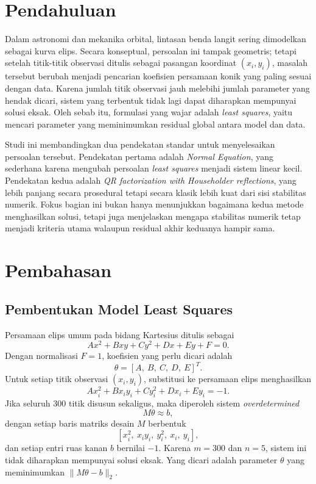 \documentclass[12pt,a4paper]{article}
\begin{document}
\section{Pendahuluan}
Dalam astronomi dan mekanika orbital, lintasan benda langit sering dimodelkan sebagai kurva elips. Secara konseptual, persoalan ini tampak geometris; tetapi setelah titik-titik observasi ditulis sebagai pasangan koordinat \((x_i,y_i)\), masalah tersebut berubah menjadi pencarian koefisien persamaan konik yang paling sesuai dengan data. Karena jumlah titik observasi jauh melebihi jumlah parameter yang hendak dicari, sistem yang terbentuk tidak lagi dapat diharapkan mempunyai solusi eksak. Oleh sebab itu, formulasi yang wajar adalah \emph{least squares}, yaitu mencari parameter yang meminimumkan residual global antara model dan data.

Studi ini membandingkan dua pendekatan standar untuk menyelesaikan persoalan tersebut. Pendekatan pertama adalah \emph{Normal Equation}, yang sederhana karena mengubah persoalan \emph{least squares} menjadi sistem linear kecil. Pendekatan kedua adalah \emph{QR factorization with Householder reflections}, yang lebih panjang secara prosedural tetapi secara klasik lebih kuat dari sisi stabilitas numerik. Fokus bagian ini bukan hanya menunjukkan bagaimana kedua metode menghasilkan solusi, tetapi juga menjelaskan mengapa stabilitas numerik tetap menjadi kriteria utama walaupun residual akhir keduanya hampir sama.

\section{Pembahasan}
\subsection{Pembentukan Model Least Squares}
Persamaan elips umum pada bidang Kartesius ditulis sebagai
\[
Ax^2 + Bxy + Cy^2 + Dx + Ey + F = 0.
\]
Dengan normalisasi \(F=1\), koefisien yang perlu dicari adalah
\[
\theta = [A,\ B,\ C,\ D,\ E]^T.
\]
Untuk setiap titik observasi \((x_i,y_i)\), substitusi ke persamaan elips menghasilkan
\[
A x_i^2 + B x_i y_i + C y_i^2 + D x_i + E y_i = -1.
\]
Jika seluruh 300 titik disusun sekaligus, maka diperoleh sistem \emph{overdetermined}
\[
M\theta \approx b,
\]
dengan setiap baris matriks desain \(M\) berbentuk
\[
[x_i^2,\ x_i y_i,\ y_i^2,\ x_i,\ y_i],
\]
dan setiap entri ruas kanan \(b\) bernilai \(-1\). Karena \(m=300\) dan \(n=5\), sistem ini tidak diharapkan mempunyai solusi eksak. Yang dicari adalah parameter \(\theta\) yang meminimumkan \(\|M\theta-b\|_2\).
\end{document}
